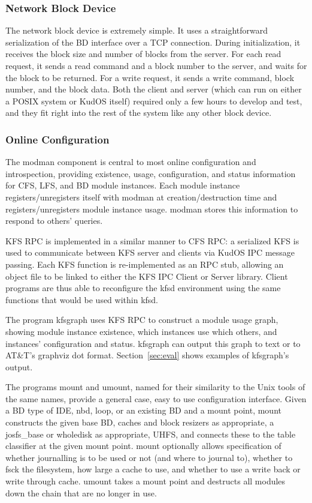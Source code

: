 \subsubsection{Network Block Device}

The network block device is extremely simple. It uses a straightforward
serialization of the BD interface over a TCP connection. During initialization,
it receives the block size and number of blocks from the server. For each read
request, it sends a read command and a block number to the server, and waits for
the block to be returned. For a write request, it sends a write command, block
number, and the block data. Both the client and server (which can run on either
a POSIX system or KudOS itself) required only a few hours to develop and test,
and they fit right into the rest of the system like any other block device.

\subsubsection{Online Configuration}
\label{sec:solution:impl:online}

The modman component is central to most online configuration and introspection,
providing existence, usage, configuration, and status information for CFS, LFS,
and BD module instances. Each module instance registers/unregisters itself with
modman at creation/destruction time and registers/unregisters module instance
usage. modman stores this information to respond to others' queries.

KFS RPC is implemented in a similar manner to CFS RPC: a serialized KFS is used
to communicate between KFS server and clients via KudOS IPC message passing.
Each KFS function is re-implemented as an RPC stub, allowing an object file to
be linked to either the KFS IPC Client or Server library. Client programs are
thus able to reconfigure the kfsd environment using the same functions that
would be used within kfsd.

The program kfsgraph uses KFS RPC to construct a module usage graph, showing
module instance existence, which instances use which others, and instances'
configuration and status. kfsgraph can output this graph to text or to AT\&T's
graphviz dot format. Section~\ref{sec:eval} shows examples of kfsgraph's output.

The programs mount and umount, named for their similarity to the Unix tools of
the same names, provide a general case, easy to use configuration interface.
Given a BD type of IDE, nbd, loop, or an existing BD and a mount point, mount
constructs the given base BD, caches and block resizers as appropriate, a
josfs\_base or wholedisk as appropriate, UHFS, and connects these to the table
classifier at the given mount point. mount optionally allows specification of
whether journalling is to be used or not (and where to journal to), whether to
fsck the filesystem, how large a cache to use, and whether to use a write back
or write through cache. umount takes a mount point and destructs all modules
down the chain that are no longer in use.
